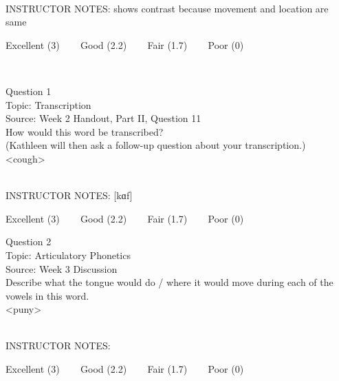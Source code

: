 \documentclass[12pt]{article}
\begin{document}
~\\
INSTRUCTOR NOTES: shows contrast because movement and location are same


\vfill
Excellent (3) ~~~ Good (2.2) ~~~ Fair (1.7) ~~~ Poor (0)
\newpage

\begin{center}
\textbf{{\color{red}{\HUGE END OF EXAM}}}\\

\end{center}
\newpage

\begin{center}
\textbf{{\color{blue}{\HUGE START OF EXAM\\}}}

\textbf{{\color{blue}{\HUGE Student ID: 76173\\}}}

\textbf{{\color{blue}{\HUGE \\}}}

\end{center}
\newpage

{\large Question 1}\\

Topic: Transcription\\
Source: Week 2 Handout, Part II, Question 11\\

How would this word be transcribed?\\ (Kathleen will then ask a follow-up question about your transcription.)\\

<cough>


~\\
INSTRUCTOR NOTES: [kɑf]


\vfill
Excellent (3) ~~~ Good (2.2) ~~~ Fair (1.7) ~~~ Poor (0)
\newpage

{\large Question 2}\\

Topic: Articulatory Phonetics\\
Source: Week 3 Discussion\\

Describe what the tongue would do / where it would move during each of the vowels in this word.\\

<puny>


~\\
INSTRUCTOR NOTES: 


\vfill
Excellent (3) ~~~ Good (2.2) ~~~ Fair (1.7) ~~~ Poor (0)
\newpage
\end{document}
